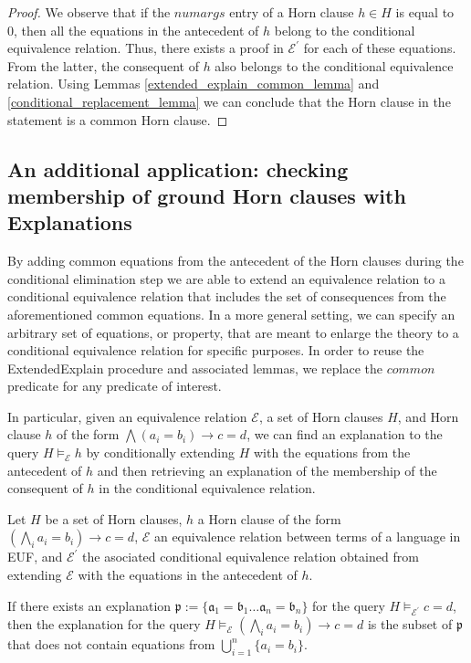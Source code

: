 \begin{proof}
  We observe that if the $numargs$ entry of a Horn clause
  $h \in H$ is equal to 0, then 
  all the equations in the antecedent of $h$ belong 
  to the conditional equivalence relation. Thus, 
  there exists a proof in $\mathcal{E^{'}}$ for
  each of these equations. From the latter, the consequent
  of $h$ also belongs to the conditional equivalence
  relation. Using Lemmas \ref{extended_explain_common_lemma}
  and \ref{conditional_replacement_lemma} we can conclude that
  the Horn clause in the statement is a common Horn clause.
\end{proof}

\subsection{An additional application: checking
  membership of ground Horn clauses 
with Explanations}

By adding common equations
from the antecedent of the Horn clauses during the 
conditional elimination step we are able to 
extend an equivalence relation to a conditional
equivalence relation that includes the set 
of consequences from the aforementioned common equations.
In a more general setting, we can specify an arbitrary
set of equations, or property, 
that are meant to enlarge the theory
to a conditional equivalence relation for 
specific purposes. In order to reuse the ExtendedExplain
procedure and associated lemmas, we replace the $common$
predicate for any predicate of interest.

In particular, given an equivalence relation $\mathcal{E}$, a 
set of Horn clauses $H$, and Horn clause $h$ of the form 
$\bigwedge (a_i = b_i) \rightarrow c = d$, we can 
find an explanation to the query $H \models_{\mathcal{E}} h$
by conditionally extending $H$ with the equations
from the antecedent of $h$ and then retrieving an explanation
of the membership of the consequent of $h$ in the conditional 
equivalence relation.

\begin{lemma}
  Let $H$ be a set of Horn clauses, $h$ a Horn clause of the
  form $(\bigwedge_i a_i = b_i) \rightarrow c = d$, 
  $\mathcal{E}$ an equivalence relation between terms 
  of a language in EUF, and $\mathcal{E^{'}}$ the asociated
  conditional equivalence relation obtained from extending
  $\mathcal{E}$ with the equations in the antecedent of $h$.

  If there exists an explanation 
  $\mathfrak{p} := \{\mathfrak{a}_1 = \mathfrak{b}_1 
  \dots \mathfrak{a}_n = \mathfrak{b}_n\}$ 
  for the query $H \models_{\mathcal{E^{'}}} c = d$,
  then the explanation for the query 
  $H \models_{\mathcal{E}} (\bigwedge_i a_i = b_i) 
  \rightarrow c = d$ is the subset of $\mathfrak{p}$
  that does not contain equations from 
  $\bigcup_{i=1}^n\{a_i = b_i\}$.
\end{lemma}

